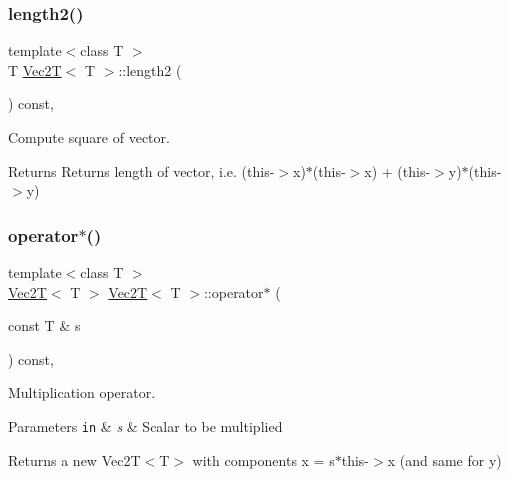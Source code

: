 \subsubsection{\texorpdfstring{length2()}{length2()}}
{\footnotesize\ttfamily template$<$class T $>$ \\
T \hyperlink{classVec2T}{Vec2T}$<$ T $>$\+::length2 (\begin{DoxyParamCaption}{ }\end{DoxyParamCaption}) const\hspace{0.3cm}{\ttfamily [inline]}, {\ttfamily [noexcept]}}



Compute square of vector. 

\begin{DoxyReturn}{Returns}
Returns length of vector, i.\+e. (this-\/$>$x)$\ast$(this-\/$>$x) + (this-\/$>$y)$\ast$(this-\/$>$y) 
\end{DoxyReturn}
\mbox{\label{classVec2T_a1047f21e704d25c4bc5980cd13c00e1c}} 
\subsubsection{\texorpdfstring{operator$\ast$()}{operator*()}}
{\footnotesize\ttfamily template$<$class T $>$ \\
\hyperlink{classVec2T}{Vec2T}$<$ T $>$ \hyperlink{classVec2T}{Vec2T}$<$ T $>$\+::operator$\ast$ (\begin{DoxyParamCaption}\item[{const T \&}]{s }\end{DoxyParamCaption}) const\hspace{0.3cm}{\ttfamily [inline]}, {\ttfamily [noexcept]}}



Multiplication operator. 


\begin{DoxyParams}[1]{Parameters}
\mbox{\tt in}  & {\em s} & Scalar to be multiplied\\
\hline
\end{DoxyParams}
Returns a new Vec2\+T$<$\+T$>$ with components x = s$\ast$this-\/$>$x (and same for y) \mbox{\label{classVec2T_ad7525f66bf0c609e79e1d2590af6be0c}} 
